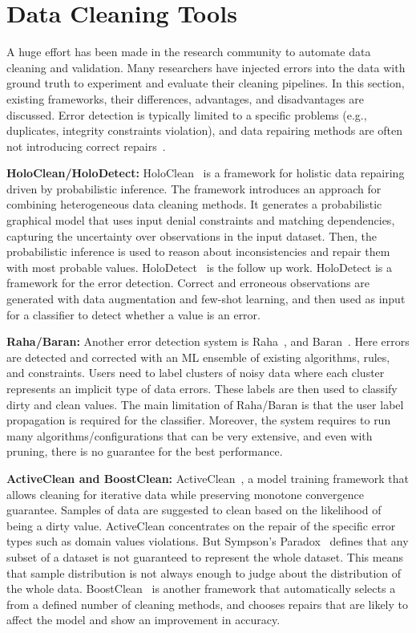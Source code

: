 
\section{Data Cleaning Tools}
\label{sec:data_cleaning_tools}

A huge effort has been made in the research community to automate data cleaning and validation. 
Many researchers have injected errors into the data with ground truth to experiment and evaluate their cleaning pipelines.
In this section, existing frameworks, their differences, advantages, and disadvantages are discussed.
Error detection is typically limited to a specific problems (e.g., duplicates, integrity constraints violation), and data repairing methods are often not introducing correct repairs~\cite{RekatsinasCIR2017}.

\textbf{HoloClean/HoloDetect:} 
HoloClean~\cite{RekatsinasCIR2017} is a framework for holistic data repairing driven by probabilistic inference. The framework introduces an approach for combining heterogeneous data cleaning methods.
It generates a probabilistic graphical model that uses input denial constraints and matching dependencies, capturing the uncertainty over observations in the input dataset. 
Then, the probabilistic inference is used to reason about inconsistencies and repair them with most probable values. %
HoloDetect~\cite{holodetect} is the follow up work. HoloDetect is a framework for the error detection.
Correct and erroneous observations are generated with data augmentation and few-shot learning, and then used as input for a classifier to detect whether a value is an error.

\textbf{Raha/Baran:} 
Another error detection system is Raha~\cite{raha}, and Baran~\cite{baran}.
Here errors are detected and corrected with an ML ensemble of existing algorithms, rules, and constraints.
Users need to label clusters of noisy data where each cluster represents an implicit type of data errors.
These labels are then used to classify dirty and clean values. 
The main limitation of Raha/Baran is that the user label propagation is required for the classifier.
Moreover, the system requires to run many algorithms/configurations that can be very extensive, and even with pruning, there is no guarantee for the best performance.

\textbf{ActiveClean and BoostClean:} 
ActiveClean~\cite{activeclean}, a model training framework that allows cleaning for iterative data while preserving monotone convergence guarantee.
Samples of data are suggested to clean based on the likelihood of being a dirty value.
ActiveClean concentrates on the repair of the specific error types such as domain values violations.
But Sympson's Paradox~\cite{activeclean} defines that any subset of a dataset is not guaranteed to represent the whole dataset.
This means that sample distribution is not always enough to judge about the distribution of the whole data. 
BoostClean~\cite{boostclean} is another framework that automatically selects a from a defined number of cleaning methods, and chooses repairs that are likely to affect the model and show an improvement in accuracy. 


